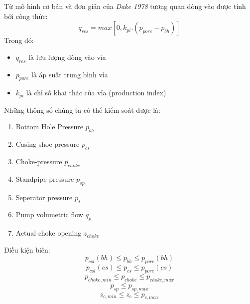 \documentclass[12pt,a4paper]{article}
\begin{document}
Từ mô hình cơ bản và đơn giản của \textit{Dake 1978} tương quan dòng vào được tính bởi công thức:
\begin{equation}
q_{res} = max [0, k_{pi}.(p_{pore}-p_{bh})]
\end{equation}
Trong đó:
\begin{itemize}
	\item $q_{res}$ là lưu lượng dòng vào vỉa
	\item $p_{pore}$ là áp suất trung bình vỉa
	\item $k_{pi}$ là chỉ số khai thác của vỉa (production index)
\end{itemize}
 Những thông số chúng ta có thể kiểm soát được là\cite{pedersen2015supervisory}:
\begin{enumerate}
 	\item[] Bottom Hole Pressure $p_{bh}$
 	\item[] Casing-shoe pressure $p_{cs}$
 	\item[] Choke-pressure $p_{choke}$
 	\item[] Standpipe pressure $p_{sp}$
 	\item[] Seperator pressure $p_{s}$
 	\item[] Pump volumetric flow $q_{p}$
 	\item[] Actual choke opening $z_{choke}$
\end{enumerate}
 Điều kiện biên:
\begin{displaymath}
p_{col}(bh) \leq p_{bh} \leq p_{pore}(bh)
\end{displaymath}
\begin{displaymath}
p_{col}(cs) \leq p_{cs} \leq p_{pore}(cs)
\end{displaymath}
\begin{displaymath}
p_{choke,min} \leq p_{choke} \leq p_{choke,max}
\end{displaymath}
\begin{displaymath}
p_{sp} \leq p_{sp,max}
\end{displaymath}
\begin{displaymath}
z_{c,min} \leq z_{c} \leq p_{c,max}
\end{displaymath}
 
\end{document}
